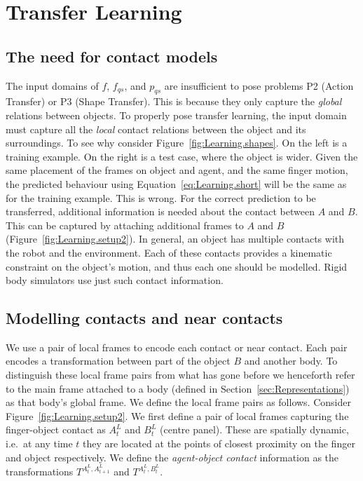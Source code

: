 
\section{Transfer Learning}
\label{sec:InfoForPrediction}

\subsection{The need for contact models}
The input domains of $f$, $f_{qs}$, and $p_{qs}$ are insufficient to pose problems P2 (Action Transfer) or P3 (Shape Transfer). This is because they only capture the {\em global} relations between objects. To properly pose transfer learning, the input domain must capture all the {\em local} contact relations between the object and its surroundings.  To see why consider Figure~\ref{fig:Learning.shapes}. On the left is a training example. On the right is a test case, where the object is wider. Given the same placement of the frames on object and agent, and the same finger motion, the predicted behaviour using Equation~\eqref{eq:Learning.short} will be the same as for the training example. This is wrong. For the correct prediction to be transferred, additional information is needed about the contact between $A$ and $B$. This can be captured by attaching additional frames to $A$ and $B$  (Figure~\ref{fig:Learning.setup2}). In general, an object has multiple contacts with the robot and the environment. Each of these contacts provides a kinematic constraint on the object's motion, and thus each one should be modelled. Rigid body simulators use just such contact information.

\subsection{Modelling contacts and near contacts} 
We use a pair of local frames to encode each contact or near contact. Each pair encodes a transformation between part of the object $B$ and another body.  To distinguish these local frame pairs from what has gone before we henceforth refer to the main frame attached to a body (defined in Section~\ref{sec:Representations}) as that body's global frame. We define the local frame pairs as follows. Consider Figure~\ref{fig:Learning.setup2}. We first define a pair of local frames capturing the finger-object contact as $A^{L}_{t}$ and $B^{L}_{t}$ (centre panel). These are spatially dynamic, i.e.\ at any time $t$ they are located at the points of closest proximity on the finger and object respectively.  We define the \textit{agent-object contact}
information as the transformations $T^{A^{L}_{t}, A^{L}_{t+1}}$ and $T^{A^{L}_t, B^{L}_t}$.

